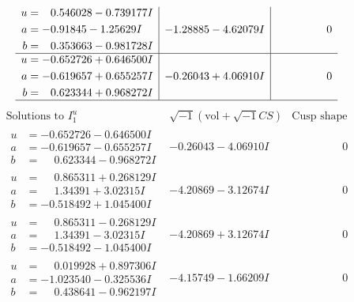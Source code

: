 \documentclass[1p]{elsarticle_modified}
\theoremstyle{definition}
\newcommand{\I}{\sqrt{-1}}
\begin{document}
$$\begin{array}{c|c|c}
\begin{aligned}
u &= \phantom{-}0.546028 - 0.739177 I \\
a &= -0.91845 - 1.25629 I \\
b &= \phantom{-}0.353663 - 0.981728 I\end{aligned}
 & -1.28885 - 4.62079 I & \phantom{-0.000000 } 0 \\ \hline\begin{aligned}
u &= -0.652726 + 0.646500 I \\
a &= -0.619657 + 0.655257 I \\
b &= \phantom{-}0.623344 + 0.968272 I\end{aligned}
 & -0.26043 + 4.06910 I & \phantom{-0.000000 } 0\\
 \hline 
 \end{array}$$\newpage$$\begin{array}{c|c|c}  
\text{Solutions to }I^u_{1}& \I (\text{vol} + \sqrt{-1}CS) & \text{Cusp shape}\\
 \hline 
\begin{aligned}
u &= -0.652726 - 0.646500 I \\
a &= -0.619657 - 0.655257 I \\
b &= \phantom{-}0.623344 - 0.968272 I\end{aligned}
 & -0.26043 - 4.06910 I & \phantom{-0.000000 } 0 \\ \hline\begin{aligned}
u &= \phantom{-}0.865311 + 0.268129 I \\
a &= \phantom{-}1.34391 + 3.02315 I \\
b &= -0.518492 + 1.045400 I\end{aligned}
 & -4.20869 - 3.12674 I & \phantom{-0.000000 } 0 \\ \hline\begin{aligned}
u &= \phantom{-}0.865311 - 0.268129 I \\
a &= \phantom{-}1.34391 - 3.02315 I \\
b &= -0.518492 - 1.045400 I\end{aligned}
 & -4.20869 + 3.12674 I & \phantom{-0.000000 } 0 \\ \hline\begin{aligned}
u &= \phantom{-}0.019928 + 0.897306 I \\
a &= -1.023540 - 0.325536 I \\
b &= \phantom{-}0.438641 - 0.962197 I\end{aligned}
 & -4.15749 - 1.66209 I & \phantom{-0.000000 } 0 \\ \hline\begin{aligned}

\end{aligned}
\end{array}$$
\end{document}
